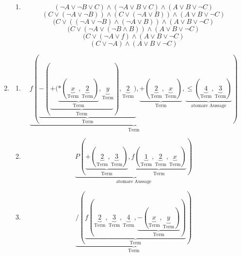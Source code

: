 \documentclass[a4paper]{article}
\begin{document}
\begin{enumerate}
\begin{enumerate}
			\item
			\begin{equation*}
				(\lnot A \lor \lnot B \lor C) \land (\lnot A \lor B \lor C) \land (A \lor B \lor \lnot C)
			\end{equation*}
			\begin{equation*}
				(C \lor (\lnot A \lor \lnot B)) \land (C \lor (\lnot A \lor B)) \land (A \lor B \lor \lnot C)
			\end{equation*}
			\begin{equation*}
				(C \lor ((\lnot A \lor \lnot B) \land (\lnot A \lor B)) \land (A \lor B \lor \lnot C)
			\end{equation*}
			\begin{equation*}
				(C \lor (\lnot A \lor (\lnot B \land B)) \land (A \lor B \lor \lnot C)
			\end{equation*}
			\begin{equation*}
				(C \lor (\lnot A \lor f) \land (A \lor B \lor \lnot C)
			\end{equation*}
			\begin{equation*}
				(C \lor \lnot A) \land (A \lor B \lor \lnot C)
			\end{equation*}
		\end{enumerate}
		
		\item
		\begin{enumerate}
			\item
			\begin{equation*}
				\underbrace{f(\underbrace{-(\underbrace{+(\underbrace{*(\underbrace{x}_{\text{Term}}, \underbrace{2}_{\text{Term}})}_{\text{Term}}, \underbrace{y}_{\text{Term}}}_{\text{Term}}), \underbrace{2}_{\text{Term}})}_{\text{Term}}, \underbrace{+(\underbrace{2}_{\text{Term}}, \underbrace{x}_{\text{Term}})}_{\text{Term}}, \underbrace{\leq(\underbrace{4}_{\text{Term}}, \underbrace{3}_{\text{Term}})}_{\text{atomare Aussage}})}_{\text{Term}}
			\end{equation*}
			
			\item
			\begin{equation*}
				\underbrace{P(\underbrace{+(\underbrace{2}_{\text{Term}}, \underbrace{3}_{\text{Term}})}_{\text{Term}}, \underbrace{f(\underbrace{1}_{\text{Term}}, \underbrace{2}_{\text{Term}}, \underbrace{x}_{\text{Term}})}_{\text{Term}})}_{\text{atomare Aussage}}
			\end{equation*}
			
			\item
			\begin{equation*}
				\underbrace{/(\underbrace{f(\underbrace{2}_{\text{Term}}, \underbrace{3}_{\text{Term}}, \underbrace{4}_{\text{Term}}, \underbrace{-(\underbrace{x}_{\text{Term}}, \underbrace{y}_{\text{Term}})}_{\text{Term}})}_{\text{Term}})}_{\text{Term}}
			\end{equation*}
			

\end{enumerate}
\end{enumerate}
\end{document}
